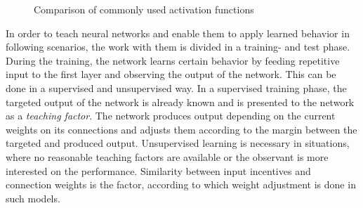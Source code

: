\documentclass[10pt,a4paper,DIV=11]{scrreprt}
\begin{document}
\begin{figure}[H]
\centering
{}


	
\caption{Comparison of commonly used activation functions}
\label{fig:plots}
\end{figure}

In order to teach neural networks and enable them to apply learned behavior in following scenarios, the work with them is divided in a training- and test phase. During the training, the network learns certain behavior by feeding repetitive input to the first layer and observing the output of the network. This can be done in a supervised and unsupervised way. In a supervised training phase, the targeted output of the network is already known and is presented to the network as a \textit{teaching factor}. The network produces output depending on the current weights on its connections and adjusts them according to the margin between the targeted and produced output. Unsupervised learning is necessary in situations, where no reasonable teaching factors are available or the observant is more interested on the performance. Similarity between input incentives and connection weights is the factor, according to which weight adjustment is done in such models.
\end{document}
